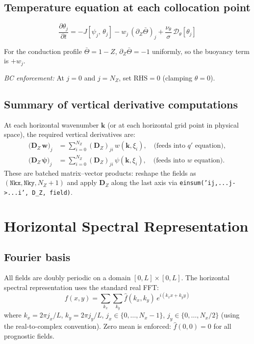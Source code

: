 \documentclass[11pt]{article}
\newcommand{\pderiv}[2]{\frac{\partial #1}{\partial #2}}
\newcommand{\Jac}[2]{J\!\left[#1,\,#2\right]}
\newcommand{\hhat}[1]{\widehat{#1}}
\newcommand{\Dvec}{\bm{D}}
\begin{document}
\subsection{Temperature equation at each collocation point}

\begin{equation}
\boxed{
\pderiv{\theta_j}{t} = -\Jac{\psi_j}{\theta_j} - w_j\,(\partial_Z\bar\Theta)_j + \frac{\nu_\theta}{\sigma}\,\mathcal{D}_\theta[\theta_j]
}
\label{eq:theta_colloc}
\end{equation}

For the conduction profile $\bar\Theta = 1 - Z$, $\partial_Z\bar\Theta = -1$ uniformly, so the buoyancy term is $+w_j$.

\emph{BC enforcement:} At $j = 0$ and $j = N_Z$, set $\text{RHS} = 0$ (clamping $\theta = 0$).

\subsection{Summary of vertical derivative computations}

At each horizontal wavenumber $\bm{k}$ (or at each horizontal grid point in physical space), the required vertical derivatives are:
\begin{align}
\big(\Dvec_Z\,\bm{w}\big)_j &= \sum_{i=0}^{N_Z} (\Dvec_Z)_{ji}\, w(\bm{k}, \xi_i), \quad\text{(feeds into $q'$ equation)},\\
\big(\Dvec_Z\,\bm{\psi}\big)_j &= \sum_{i=0}^{N_Z} (\Dvec_Z)_{ji}\, \psi(\bm{k}, \xi_i), \quad\text{(feeds into $w$ equation)}.
\end{align}
These are batched matrix--vector products: reshape the fields as $(\texttt{Nkx}, \texttt{Nky}, N_Z+1)$ and apply $\Dvec_Z$ along the last axis via \texttt{einsum('ij,...j->...i', D\_Z, field)}.


\section{Horizontal Spectral Representation}
\label{sec:horizontal}

\subsection{Fourier basis}

All fields are doubly periodic on a domain $[0, L] \times [0, L]$. The horizontal spectral representation uses the standard real FFT:
\begin{equation}
f(x,y) = \sum_{k_x}\sum_{k_y} \hhat{f}(k_x,k_y)\,e^{i(k_x x + k_y y)}
\end{equation}
where $k_x = 2\pi j_x/L$, $k_y = 2\pi j_y/L$, $j_x \in \{0, \ldots, N_x-1\}$, $j_y \in \{0, \ldots, N_x/2\}$ (using the real-to-complex convention). Zero mean is enforced: $\hhat{f}(0,0) = 0$ for all prognostic fields.
\end{document}
